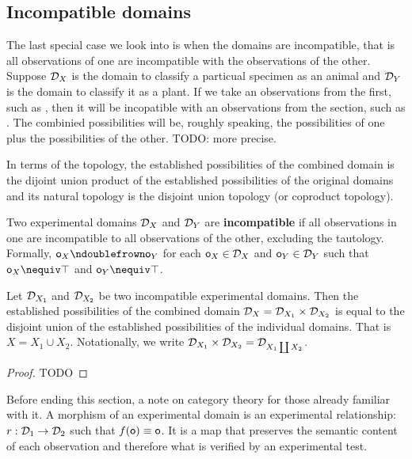 \documentclass[11pt,letterpaper,fleqn]{memoir} %
\begin{document}
\subsection{Incompatible domains}

The last special case we look into is when the domains are incompatible, that is all observations of one are incompatible with the observations of the other. Suppose $\mathcal{D}_X$ is the domain to classify a particual specimen as an animal and $\mathcal{D}_Y$ is the domain to classify it as a plant. If we take an observations from the first, such as , then it will be incopatible with an observations from the section, such as . The combinied possibilities will be, roughly speaking, the possibilities of one plus the possibilities of the other. TODO: more precise.

In terms of the topology, the established possibilities of the combined domain is the dijoint union product of the established possibilities of the original domains and its natural topology is the disjoint union topology (or coproduct topology).

\begin{mathSection}
	\begin{defn}
		Two experimental domains $\mathcal{D}_X$ and $\mathcal{D}_Y$ are \textbf{incompatible} if all observations in one are incompatible to all observations of the other, excluding the tautology. Formally, $\obs_X \ncomp \obs_Y$ for each $\mathsf{o}_X \in \mathcal{D}_X$ and $\mathsf{o}_Y \in \mathcal{D}_Y$ such that $\obs_X \nequiv \tautology $ and $\obs_Y \nequiv \tautology$.
	\end{defn}
	\begin{prop}
		Let $\mathcal{D}_{X_1}$ and $\mathcal{D}_{X_2}$ be two incompatible experimental domains. Then the established possibilities of the combined domain $\mathcal{D}_X = \mathcal{D}_{X_1} \times \mathcal{D}_{X_2}$ is equal to the disjoint union of the established possibilities of the individual domains. That is $X = X_1 \cup X_2$. Notationally, we write $\mathcal{D}_{X_1} \times \mathcal{D}_{X_2} = \mathcal{D}_{X_1 \coprod X_2}$.
	\end{prop}
	\begin{proof}
		TODO
	\end{proof}
\end{mathSection}

Before ending this section, a note on category theory for those already familiar with it. A morphism of an experimental domain is an experimental relationship: $r : \mathcal{D}_1 \to \mathcal{D}_2$ such that $f(\mathsf{o}) \equiv \mathsf{o}$. It is a map that preserves the semantic content of each observation and therefore what is verified by an experimental test.
\end{document}
